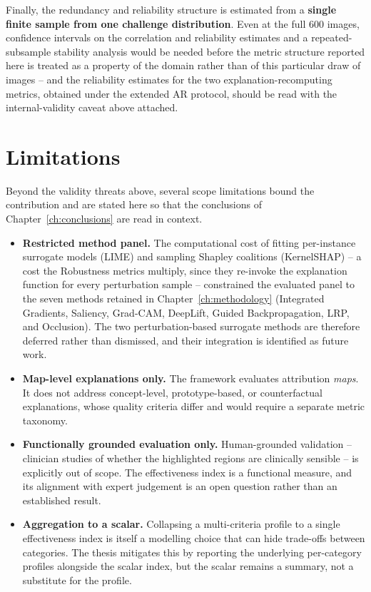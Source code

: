 Finally, the redundancy and reliability structure is estimated from a
\textbf{single finite sample from one challenge distribution}. Even at the full
$600$ images, confidence intervals on the correlation and reliability estimates
and a repeated-subsample stability analysis would be needed before the metric
structure reported here is treated as a property of the domain rather than of
this particular draw of images -- and the reliability estimates for the two
explanation-recomputing metrics, obtained under the extended AR protocol,
should be read with the internal-validity caveat above attached.

\section{Limitations}
\label{sec:disc-limitations}

Beyond the validity threats above, several scope limitations bound the
contribution and are stated here so that the conclusions of
Chapter~\ref{ch:conclusions} are read in context.

\begin{itemize}
    \item \textbf{Restricted method panel.} The computational cost of fitting
    per-instance surrogate models (LIME) and sampling Shapley coalitions
    (KernelSHAP) -- a cost the Robustness metrics multiply, since they re-invoke
    the explanation function for every perturbation
    sample -- constrained the evaluated panel to the seven methods
    retained in Chapter~\ref{ch:methodology} (Integrated Gradients, Saliency,
    Grad-CAM, DeepLift, Guided Backpropagation, LRP, and Occlusion). The two
    perturbation-based surrogate methods are therefore deferred rather than
    dismissed, and their integration is identified as future work.
    \item \textbf{Map-level explanations only.} The framework evaluates
    attribution \emph{maps}. It does not address concept-level, prototype-based,
    or counterfactual explanations, whose quality criteria differ and would
    require a separate metric taxonomy.
    \item \textbf{Functionally grounded evaluation only.} Human-grounded
    validation -- clinician studies of whether the highlighted regions are
    clinically sensible -- is explicitly out of scope. The effectiveness index is
    a functional measure, and its alignment with expert judgement is an open
    question rather than an established result.
    \item \textbf{Aggregation to a scalar.} Collapsing a multi-criteria profile
    to a single effectiveness index is itself a modelling choice that can hide
    trade-offs between categories. The thesis mitigates this by reporting the
    underlying per-category profiles alongside the scalar index, but the scalar
    remains a summary, not a substitute for the profile.
\end{itemize}
